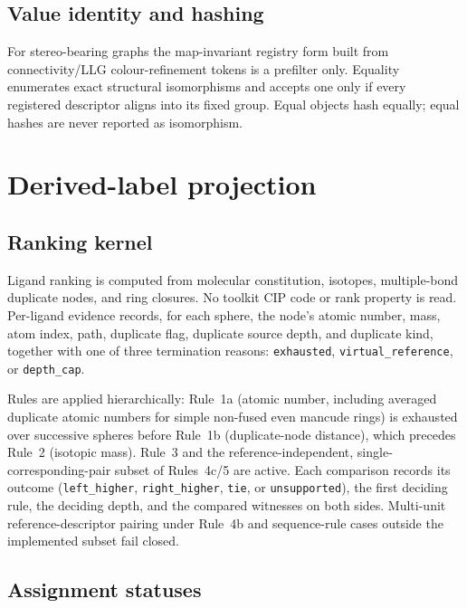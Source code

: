 \documentclass[pdflatex,sn-mathphys-num,referee,lineno]{sn-jnl}
\newcommand{\code}[1]{\texttt{#1}}
\theoremstyle{plain}
\theoremstyle{remark}
\theoremstyle{definition}
\begin{document}
\subsection{Value identity and hashing}

For stereo-bearing graphs the map-invariant registry form built from
connectivity/LLG colour-refinement tokens is a prefilter only.
Equality enumerates exact structural isomorphisms and accepts one only if every
registered descriptor aligns into its fixed group.  Equal objects hash equally;
equal hashes are never reported as isomorphism.

\section{Derived-label projection}
\label{sec:si-cip}

\subsection{Ranking kernel}

Ligand ranking is computed from molecular constitution, isotopes,
multiple-bond duplicate nodes, and ring closures.  No toolkit CIP code or rank
property is read.  Per-ligand evidence records, for each sphere, the node's
atomic number, mass, atom index, path, duplicate flag, duplicate source depth,
and duplicate kind, together with one of three termination reasons:
\code{exhausted}, \code{virtual\_reference}, or \code{depth\_cap}.

Rules are applied hierarchically: Rule~1a (atomic number, including averaged
duplicate atomic numbers for simple non-fused even mancude rings) is exhausted
over successive spheres before Rule~1b (duplicate-node distance), which
precedes Rule~2 (isotopic mass).  Rule~3 and the reference-independent,
single-corresponding-pair subset of Rules~4c/5 are active.  Each comparison
records its outcome
(\code{left\_higher}, \code{right\_higher}, \code{tie}, or
\code{unsupported}), the first deciding rule, the deciding depth, and the
compared witnesses on both sides.  Multi-unit reference-descriptor pairing
under Rule~4b and sequence-rule cases outside the implemented subset fail
closed.

\subsection{Assignment statuses}
\end{document}

